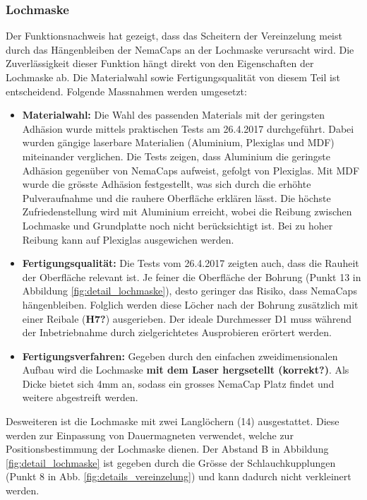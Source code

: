 \subsubsection{Lochmaske}
\label{lochmaske}
Der Funktionsnachweis hat gezeigt, dass das Scheitern der Vereinzelung meist durch das Hängenbleiben der NemaCaps an der Lochmaske verursacht wird. Die Zuverlässigkeit dieser Funktion hängt direkt von den Eigenschaften der Lochmaske ab. Die Materialwahl sowie Fertigungsqualität von diesem Teil ist entscheidend. 
\newline
Folgende Massnahmen werden umgesetzt:
\begin{itemize}
	\item \textbf{Materialwahl:} Die Wahl des passenden Materials mit der geringsten Adhäsion wurde mittels praktischen Tests am 26.4.2017 durchgeführt. Dabei wurden gängige laserbare Materialien (Aluminium, Plexiglas und MDF) miteinander verglichen. Die Tests zeigen, dass Aluminium die geringste Adhäsion gegenüber von NemaCaps aufweist, gefolgt von Plexiglas. Mit MDF wurde die grösste Adhäsion festgestellt, was sich durch die erhöhte Pulveraufnahme und die rauhere Oberfläche erklären lässt. 
	Die höchste Zufriedenstellung wird mit Aluminium erreicht, wobei die Reibung zwischen Lochmaske und Grundplatte noch nicht berücksichtigt ist. Bei zu hoher Reibung kann auf Plexiglas ausgewichen werden.
	
	\item \textbf{Fertigungsqualität:} Die Tests vom 26.4.2017 zeigten auch, dass die Rauheit der Oberfläche relevant ist. Je feiner die Oberfläche der Bohrung (Punkt 13 in Abbildung \ref{fig:detail_lochmaske}), desto geringer das Risiko, dass NemaCaps hängenbleiben. Folglich werden diese Löcher nach der Bohrung zusätzlich mit einer Reibale (\textbf{H7?}) ausgerieben. Der ideale Durchmesser D1 muss während der Inbetriebnahme durch zielgerichtetes Ausprobieren erörtert werden.
	
	\item \textbf{Fertigungsverfahren:} Gegeben durch den einfachen zweidimensionalen Aufbau wird die Lochmaske \textbf{mit dem Laser hergsetellt (korrekt?)}. Als Dicke bietet sich 4mm an, sodass ein grosses NemaCap Platz findet und weitere abgestreift werden.
\end{itemize}
Desweiteren ist die Lochmaske mit zwei Langlöchern (14) ausgestattet. Diese werden zur Einpassung von Dauermagneten verwendet, welche zur Positionsbestimmung der Lochmaske dienen. Der Abstand B in Abbildung \ref{fig:detail_lochmaske} ist gegeben durch die Grösse der Schlauchkupplungen (Punkt 8 in Abb. \ref{fig:details_vereinzelung}) und kann dadurch nicht verkleinert werden.
